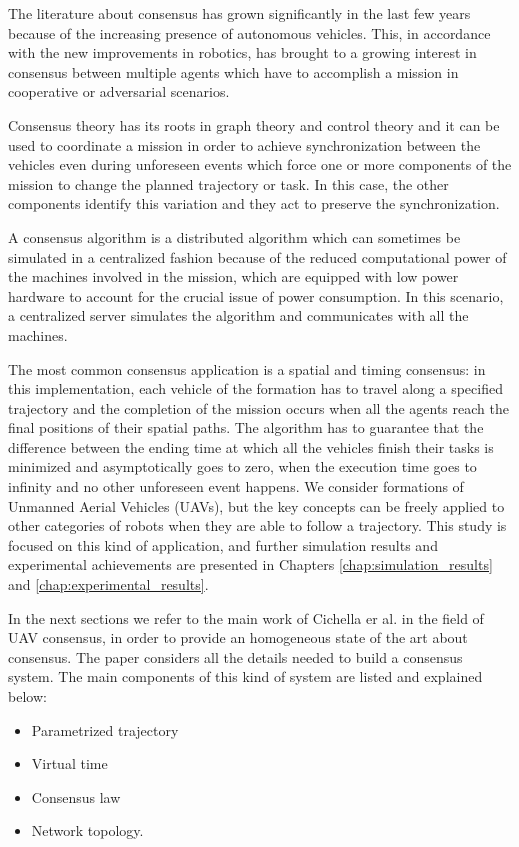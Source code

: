 The literature about consensus has grown significantly in the last few years
because of the increasing presence of autonomous vehicles. This, in accordance with
the new improvements in robotics, has brought to a growing interest in consensus
between multiple agents which have to accomplish a mission in cooperative or adversarial
scenarios.

Consensus theory has its roots in graph theory and control theory and it can
be used to coordinate a mission in order to achieve synchronization between
the vehicles even during unforeseen events which force one or more
components of the mission to change the planned trajectory or task. In this case,
the other components identify this variation and they act to preserve the
synchronization.

A consensus algorithm is a distributed algorithm which can sometimes be simulated
in a centralized fashion because of the reduced computational power of the machines
involved in the mission, which are equipped with low power hardware to account for
the crucial issue of power consumption.
In this scenario, a centralized server simulates the algorithm and communicates with
all the machines.

The most common consensus application is a spatial and timing consensus: in this
implementation, each vehicle of the formation has to travel along a specified trajectory and the
completion of the mission occurs when all the agents reach the final positions of their
spatial paths. The algorithm has to guarantee that the difference between
the ending time at which all the vehicles finish their tasks is minimized and
asymptotically goes to zero, when the execution time goes to infinity and no other
unforeseen event happens.
We consider formations of Unmanned Aerial Vehicles (UAVs), but the key concepts can
be freely applied to other categories of robots when they are able to follow a trajectory.
This study is focused on this kind of application, and further
simulation results and experimental achievements are presented in Chapters
\ref{chap:simulation_results} and \ref{chap:experimental_results}.

In the next sections we refer to the main work of Cichella er al.\cite{cichellaMain}
in the field of UAV consensus, in order to provide an homogeneous state of the art
about consensus.
The paper considers all the details needed to build a consensus system.
The main components of this kind of system are listed and explained below:
\begin{itemize}
  \item Parametrized trajectory
  \item Virtual time
  \item Consensus law
  \item Network topology.
\end{itemize}












